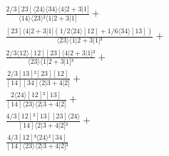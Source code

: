 \documentclass[varwidth, border=5pt]{standalone}
\begin{document}
\begin{my}
$\begin{gathered}
\scriptscriptstyle\frac{2/3[23]⟨24⟩⟨34⟩⟨4|2+3|1]}{⟨14⟩⟨23⟩²⟨1|2+3|1]} +\\
\scriptscriptstyle\frac{[23]⟨4|2+3|1](1/2⟨24⟩[12]+1/6⟨34⟩[13])}{⟨23⟩⟨1|2+3|1]²} +\\
\scriptscriptstyle\frac{2/3⟨12⟩[12][23]⟨4|2+3|1]²}{⟨23⟩⟨1|2+3|1]³} +\\
\scriptscriptstyle\frac{2/3[13]²[23][12]}{[14][34]⟨2|3+4|2]} +\\
\scriptscriptstyle\frac{2⟨24⟩[12]²[13]}{[14]⟨23⟩⟨2|3+4|2]} +\\
\scriptscriptstyle\frac{4/3[12]²[13][23]⟨24⟩}{[14]⟨2|3+4|2]²} +\\
\scriptscriptstyle\frac{4/3[12]³⟨24⟩²[34]}{[14]⟨23⟩⟨2|3+4|2]²} \phantom{+}
\end{gathered}$
\end{my}
\end{document}
